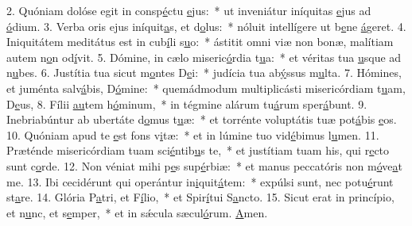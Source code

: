 2. Quóniam dolóse egit in consp\uline{é}ctu \uline{e}jus:~* ut inveniátur iníquitas \uline{e}jus ad \uline{ó}dium.
3. Verba oris ejus iníquit\uline{a}s, et d\uline{o}lus:~* nóluit intellígere ut b\uline{e}ne \uline{á}geret.
4. Iniquitátem meditátus est in cub\uline{í}li s\uline{u}o:~* ástitit omni viæ non bonæ, malítiam autem n\uline{o}n od\uline{í}vit.
5. Dómine, in cælo miseric\uline{ó}rdia t\uline{u}a:~* et véritas tua \uline{u}sque ad n\uline{u}bes.
6. Justítia tua sicut m\uline{o}ntes D\uline{e}i:~* judícia tua ab\uline{ý}ssus m\uline{u}lta.
7. Hómines, et juménta salv\uline{á}bis, D\uline{ó}mine:~* quemádmodum multiplicásti misericórdiam t\uline{u}am, D\uline{e}us,
8. Fílii \uline{au}tem h\uline{ó}minum,~* in tégmine alárum tu\uline{á}rum sper\uline{á}bunt.
9. Inebriabúntur ab ubertáte d\uline{o}mus t\uline{u}æ:~* et torrénte voluptátis tuæ pot\uline{á}bis \uline{e}os.
10. Quóniam apud te \uline{e}st fons v\uline{i}tæ:~* et in lúmine tuo vid\uline{é}bimus l\uline{u}men.
11. Præténde misericórdiam tuam sci\uline{é}ntib\uline{u}s te,~* et justítiam tuam his, qui r\uline{e}cto sunt c\uline{o}rde.
12. Non véniat mihi p\uline{e}s sup\uline{é}rbiæ:~* et manus peccatóris non m\uline{ó}ve\uline{a}t me.
13. Ibi cecidérunt qui operántur in\uline{i}quit\uline{á}tem:~* expúlsi sunt, nec potu\uline{é}runt st\uline{a}re.
14. Glória P\uline{a}tri, et F\uline{í}lio,~* et Spir\uline{í}tui S\uline{a}ncto.
15. Sicut erat in princípio, et n\uline{u}nc, et s\uline{e}mper,~* et in sǽcula sæcul\uline{ó}rum. \uline{A}men.
